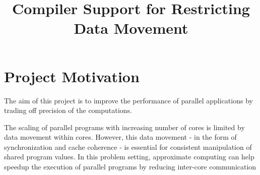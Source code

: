 \documentclass[12pt,conference]{IEEEtran}
\begin{document}
%
\title{Compiler Support for Restricting Data Movement}


\author{
\and
{}
}



\maketitle






%
\IEEEpeerreviewmaketitle



\section{Project Motivation}

The aim of this project is to improve the performance of parallel 
applications by trading off precision of the computations. 

The scaling of parallel programs with increasing number of cores
is limited by data movement within cores. However, this data 
movement - in the form of synchronization and cache coherence - 
is essential for consistent manipulation of shared program values.
In this problem setting, approximate computing can help speedup the 
execution of parallel programs by reducing inter-core communication
\end{document}
